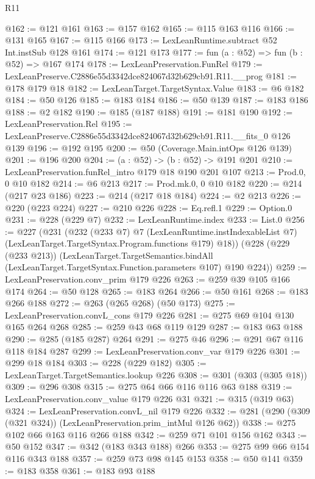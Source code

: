 \begin{lexlean}{R11}
\begin{coremodule}
@162 := @121 @161
@163 := @157 @162
@165 := @115 @163 @116
@166 := @131 @165
@167 := @115 @166
@173 := LexLeanRuntime.subtract @52 Int.instSub @128 @161
@174 := @121 @173
@177 := fun (a : @52) => fun (b : @52) => @167 @174
@178 := LexLeanPreservation.FunRel
@179 := LexLeanPreserve.C2886e55d3342dce824067d32b629cb91.R11.__prog
@181 := @178 @179 @18
@182 := LexLeanTarget.TargetSyntax.Value
@183 := @6 @182
@184 := @50 @126
@185 := @183 @184
@186 := @50 @139
@187 := @183 @186
@188 := @2 @182
@190 := @185 (@187 @188)
@191 := @181 @190
@192 := LexLeanPreservation.Rel
@195 := LexLeanPreserve.C2886e55d3342dce824067d32b629cb91.R11.__fits_0 @126 @139
@196 := @192 @195
@200 := @50 (Coverage.Main.intOps @126 @139)
@201 := @196 @200
@204 := (a : @52) -> (b : @52) -> @191 @201
@210 := LexLeanPreservation.funRel_intro @179 @18 @190 @201 @107
@213 := Prod.{0, 0} @10 @182
@214 := @6 @213
@217 := Prod.mk.{0, 0} @10 @182
@220 := @214 (@217 @23 @186)
@223 := @214 (@217 @18 @184)
@224 := @2 @213
@226 := @220 (@223 @224)
@227 := @210 @226
@228 := Eq.refl.{1}
@229 := Option.{0}
@231 := @228 (@229 @7)
@232 := LexLeanRuntime.index
@233 := List.{0}
@256 := @227
    (@231
      (@232
        (@233 @7)
        @7
        (LexLeanRuntime.instIndexableList @7)
        (LexLeanTarget.TargetSyntax.Program.functions @179)
        @18))
    (@228
      (@229 (@233 @213))
      (LexLeanTarget.TargetSemantics.bindAll
        (LexLeanTarget.TargetSyntax.Function.parameters @107)
        @190
        @224))
@259 := LexLeanPreservation.conv_prim @179 @226
@263 := @259 @39 @105 @166 @174
@264 := @50 @128
@265 := @183 @264
@266 := @50 @161
@268 := @183 @266 @188
@272 := @263 (@265 @268) (@50 @173)
@275 := LexLeanPreservation.convL_cons @179 @226
@281 := @275 @69 @104 @130 @165 @264 @268
@285 := @259 @43 @68 @119 @129
@287 := @183 @63 @188
@290 := @285 (@185 @287) @264
@291 := @275 @46
@296 := @291 @67 @116 @118 @184 @287
@299 := LexLeanPreservation.conv_var @179 @226
@301 := @299 @18 @184
@303 := @228 (@229 @182)
@305 := LexLeanTarget.TargetSemantics.lookup @226
@308 := @301 (@303 (@305 @18))
@309 := @296 @308
@315 := @275 @64 @66 @116 @116 @63 @188
@319 := LexLeanPreservation.conv_value @179 @226 @31
@321 := @315 (@319 @63)
@324 := LexLeanPreservation.convL_nil @179 @226
@332 := @281 (@290 (@309 (@321 @324)) (LexLeanPreservation.prim_intMul @126 @62))
@338 := @275 @102 @66 @163 @116 @266 @188
@342 := @259 @71 @101 @156 @162
@343 := @50 @152
@347 := @342 (@183 @343 @188) @266
@353 := @275 @99 @66 @154 @116 @343 @188
@357 := @259 @73 @98 @145 @153
@358 := @50 @141
@359 := @183 @358
@361 := @183 @93 @188

\end{coremodule}
\end{lexlean}
